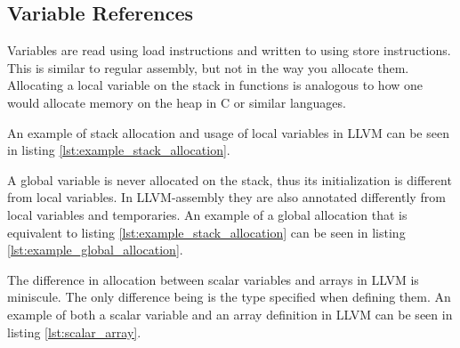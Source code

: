 
\subsection{Variable References}

Variables are read using load instructions and written to using store instructions. This is similar to regular assembly, but not in the way you allocate them.
Allocating a local variable on the stack in functions is analogous to how one would allocate memory on the heap in C or similar languages.

An example of stack allocation and usage of local variables in LLVM can be seen in listing \ref{lst:example_stack_allocation}.



A global variable is never allocated on the stack, thus its initialization is different from local variables. In LLVM-assembly they are also annotated differently from local variables and temporaries.
An example of a global allocation that is equivalent to listing \ref{lst:example_stack_allocation} can be seen in listing \ref{lst:example_global_allocation}.



The difference in allocation between scalar variables and arrays in LLVM is miniscule. The only difference being is the type specified when defining them. An example of both a scalar variable and an array definition in LLVM can be seen in listing \ref{lst:scalar_array}.

